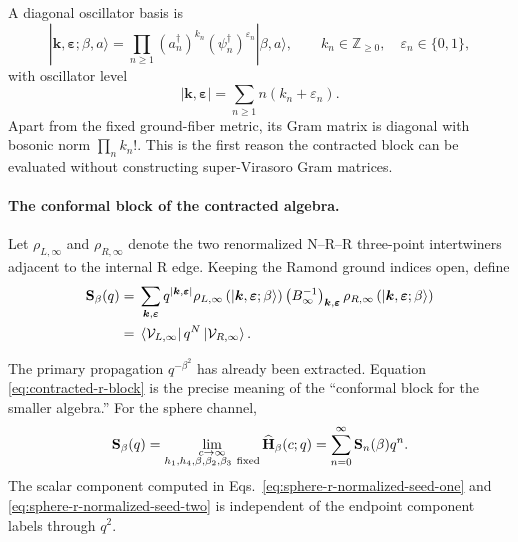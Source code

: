 \documentclass[11pt]{article}
\begin{document}
A diagonal oscillator basis is
\begin{equation}
 |\boldsymbol k,\boldsymbol\varepsilon;\beta,a\rangle
 =
 \prod_{n\geq1}
 (a_n^\dagger)^{k_n}
 (\psi_n^\dagger)^{\varepsilon_n}
 |\beta,a\rangle,
 \qquad
 k_n\in\mathbb Z_{\geq0},\quad
 \varepsilon_n\in\{0,1\},
 \label{eq:contracted-fock-basis}
\end{equation}
with oscillator level
\begin{equation}
 |\boldsymbol k,\boldsymbol\varepsilon|
 =
 \sum_{n\geq1}n(k_n+\varepsilon_n).
 \label{eq:contracted-level}
\end{equation}
Apart from the fixed ground-fiber metric, its Gram matrix is diagonal with
bosonic norm
\(\prod_n k_n!\).  This is the first reason the contracted block can be
evaluated without constructing super-Virasoro Gram matrices.

\begin{samepage}
\paragraph{The conformal block of the contracted algebra.}
Let
\(\rho_{L,\infty}\) and \(\rho_{R,\infty}\) denote the two renormalized
N--R--R three-point intertwiners adjacent to the internal R edge.  Keeping
the Ramond ground indices open, define
\begin{align}
 \mathbf S_\beta(q)
 ={}&
 \sum_{\boldsymbol k,\boldsymbol\varepsilon}
 q^{|\boldsymbol k,\boldsymbol\varepsilon|}
 \rho_{L,\infty}
 \left(
 |\boldsymbol k,\boldsymbol\varepsilon;\beta\rangle
 \right)
 \left(B_{\infty}^{-1}\right)_
 {\boldsymbol k,\boldsymbol\varepsilon}
 \rho_{R,\infty}
 \left(
 |\boldsymbol k,\boldsymbol\varepsilon;\beta\rangle
 \right)
 \notag\\
 ={}&
 \left\langle\mathcal V_{L,\infty}\right|
 q^N
 \left|\mathcal V_{R,\infty}\right\rangle .
 \label{eq:contracted-r-block}
\end{align}
\end{samepage}
The primary propagation \(q^{-\beta^2}\) has already been extracted.
Equation \eqref{eq:contracted-r-block} is the precise meaning of the
``conformal block for the smaller algebra.''  For the sphere channel,
\begin{equation}
 \mathbf S_\beta(q)
 =
 \lim_{\substack{c\to\infty\\
 h_1,h_4,\beta,\beta_2,\beta_3\ {\rm fixed}}}
 \widehat{\mathbf H}_\beta(c;q)
 =
 \sum_{n=0}^{\infty}\mathbf S_n(\beta)q^n .
 \label{eq:contracted-r-block-limit}
\end{equation}
The scalar component computed in
Eqs.~\eqref{eq:sphere-r-normalized-seed-one} and
\eqref{eq:sphere-r-normalized-seed-two} is independent of the endpoint
component labels through \(q^2\).
\end{document}
